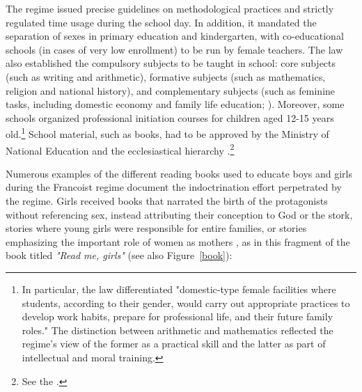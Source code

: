 \documentclass[a4paper,oneside,final,onecolumn,12pt,english]{article}
\begin{document}
The regime issued precise guidelines on methodological practices and strictly regulated time usage during the school day.  %
 In addition, it mandated the separation of sexes in primary education and kindergarten, with  co-educational schools (in cases of very low enrollment) to be run by female teachers. %
 The law also established the compulsory subjects to be taught in school: core subjects (such as writing and arithmetic), formative subjects (such as mathematics, religion and national history), and complementary subjects (such as feminine tasks, including domestic economy and family life education; \cite[see][p. 215]{perez_canto}).  Moreover, some schools organized professional initiation courses for children aged 12-15 years old.\footnote{In particular, the law differentiated "domestic-type female facilities  where students, according to their gender, would carry out appropriate practices to develop work habits, prepare for professional life, and their future family roles." The distinction between arithmetic and mathematics  reflected the regime’s view of the former as a practical skill and the latter as part of intellectual and moral training.} School material, such as books, had to be approved by the Ministry of National Education and the ecclesiastical hierarchy \citep[][p. 97]{gonzalez_perez2009}.\footnote{See the \citet[][p. 385-394]{boe1945}.} 
 
 Numerous examples of the different reading books used to educate boys and girls during the Francoist regime document the indoctrination effort perpetrated by the regime. Girls received books that narrated the birth of the protagonists without referencing sex, instead attributing their conception to God or the stork, stories where young girls were responsible for entire families, or stories emphasizing the important role of women as mothers \citep[][]{mahamud2016}, as in this fragment of the book titled \textit{"Read me, girls"} (see also Figure~\ref{book}):
\end{document}
